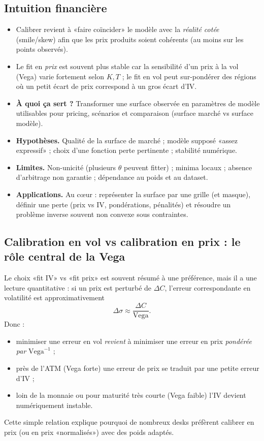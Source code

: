 \documentclass[11pt,a4paper]{report}
\theoremstyle{definition}
\theoremstyle{plain}
\theoremstyle{remark}
\newcommand{\1}{\mathbf{1}}
\newcommand{\qa}[4]{
\begin{itemize}[leftmargin=*]
\item \textbf{À quoi ça sert ?} #1
\item \textbf{Hypothèses.} #2
\item \textbf{Limites.} #3
\item \textbf{Applications.} #4
\end{itemize}
}
\begin{document}
\subsection*{Intuition financière}
\begin{itemize}[leftmargin=*]
\item Calibrer revient à «faire coïncider» le modèle avec la \emph{réalité cotée} (smile/skew) afin que les prix produits soient cohérents (au moins sur les points observés).
\item Le fit en \emph{prix} est souvent plus stable car la sensibilité d'un prix à la vol (Vega) varie fortement selon $K,T$ ; le fit en vol peut sur-pondérer des régions où un petit écart de prix correspond à un gros écart d'IV.
\end{itemize}

\qa
{Transformer une surface observée en paramètres de modèle utilisables pour pricing, scénarios et comparaison (surface marché vs surface modèle).}
{Qualité de la surface de marché ; modèle supposé «assez expressif» ; choix d'une fonction perte pertinente ; stabilité numérique.}
{Non-unicité (plusieurs $\theta$ peuvent fitter) ; minima locaux ; absence d'arbitrage non garantie ; dépendance au poids et au dataset.}
{Au c\oe{}ur : représenter la surface par une grille (et masque), définir une perte (prix vs IV, pondérations, pénalités) et résoudre un problème inverse souvent non convexe sous contraintes.}

\subsection*{Calibration en vol vs calibration en prix : le rôle central de la Vega}
Le choix «fit IV» vs «fit prix» est souvent résumé à une préférence, mais il a une lecture quantitative :
si un prix est perturbé de $\Delta C$, l'erreur correspondante en volatilité est approximativement
\[
\Delta \sigma \approx \frac{\Delta C}{\text{Vega}}.
\]
Donc :
\begin{itemize}[leftmargin=*]
\item minimiser une erreur en vol \emph{revient} à minimiser une erreur en prix \emph{pondérée par} $\text{Vega}^{-1}$ ;
\item près de l'ATM (Vega forte) une erreur de prix se traduit par une petite erreur d'IV ;
\item loin de la monnaie ou pour maturité très courte (Vega faible) l'IV devient numériquement instable.
\end{itemize}
Cette simple relation explique pourquoi de nombreux desks préfèrent calibrer en prix (ou en prix «normalisés») avec des poids adaptés.
\end{document}
